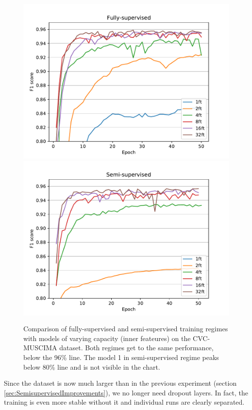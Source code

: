 \begin{figure}[p]
    \centering
    \includegraphics[width=140mm]{../../figures/02-cvc-improvements/supervised.pdf}
    \includegraphics[width=140mm]{../../figures/02-cvc-improvements/semisupervised.pdf}
    \caption{Comparison of fully-supervised and semi-supervised training regimes with models of varying capacity (inner feateures) on the CVC-MUSCIMA dataset. Both regimes get to the same performance, below the 96\% line. The model 1 in semi-supervised regime peaks below 80\% line and is not visible in the chart.}
    \label{fig:CvcImprovements}
\end{figure}

Since the dataset is now much larger than in the previous experiment (section \ref{sec:SemisupervisedImprovements}), we no longer need dropout layers. In fact, the training is even more stable without it and individual runs are clearly separated.

